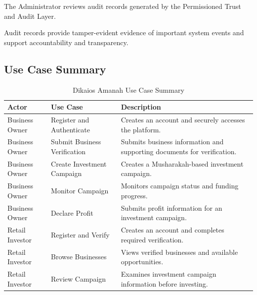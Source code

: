 The Administrator reviews audit records generated by the Permissioned Trust
and Audit Layer.

Audit records provide tamper-evident evidence of important system events and
support accountability and transparency.



\subsection{Use Case Summary}

\begin{table}[H]
\centering
\caption{Dikaios Amanah Use Case Summary}
\label{tab:use-case-summary}
\begin{tabularx}{\textwidth}{>{\raggedright\arraybackslash}p{}
>{\raggedright\arraybackslash}p{}
X}
\toprule
\textbf{Actor} & \textbf{Use Case} & \textbf{Description} \\
\midrule

Business Owner &
Register and Authenticate &
Creates an account and securely accesses the platform. \\

Business Owner &
Submit Business Verification &
Submits business information and supporting documents for verification. \\

Business Owner &
Create Investment Campaign &
Creates a Musharakah-based investment campaign. \\

Business Owner &
Monitor Campaign &
Monitors campaign status and funding progress. \\

Business Owner &
Declare Profit &
Submits profit information for an investment campaign. \\

Retail Investor &
Register and Verify &
Creates an account and completes required verification. \\

Retail Investor &
Browse Businesses &
Views verified businesses and available opportunities. \\

Retail Investor &
Review Campaign &
Examines investment campaign information before investing. \\


\end{tabularx}
\end{table}
